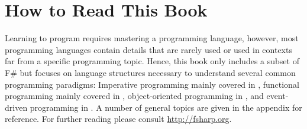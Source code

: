 \section{How to Read This Book}
Learning to program requires mastering a programming language, however, most programming languages contain details that are rarely used or used in contexts far from a specific programming topic. Hence, this book only includes a subset of F\# but focuses on language structures necessary to understand several common programming paradigms: Imperative programming mainly covered in , functional programming mainly covered in , object-oriented programming in , and event-driven programming in .  A number of general topics are given in the appendix for reference. For further reading please consult \url{http://fsharp.org}.

